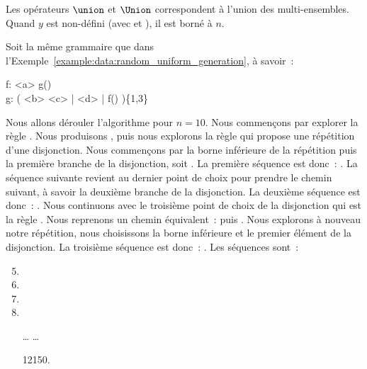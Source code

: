 Les opérateurs $\union$ et $\Union$ correspondent à l'union des multi-ensembles.
Quand $y$ est non-défini (avec \code{*} et \code{+}), il est borné à $n$.

\begin{example}
\label{example:data:bounded_exhaustive_generation}

Soit la même grammaire que dans
l'Exemple~\ref{example:data:random_uniform_generation}, à savoir~:

\begin{pre}
f: <a> g() \\
g: ( <b> <c> | <d> | f() )\{1,3\}
\end{pre}

Nous allons dérouler l'algorithme pour $n = 10$. Nous commençons par explorer
la règle . Nous produisons , puis nous explorons la règle
 qui propose une répétition d'une disjonction.  Nous commençons par la
borne inférieure de la répétition puis la première branche de la disjonction,
soit . La première séquence est donc~: . La
séquence suivante revient au dernier point de choix pour prendre le chemin
suivant, à savoir la deuxième branche de la disjonction. La deuxième séquence
est donc~: . Nous continuons avec le troisième point de choix de
la disjonction qui est la règle . Nous reprenons un chemin équivalent~:
 puis . Nous explorons à nouveau notre répétition, nous
choisissons la borne inférieure et le premier élément de la disjonction. La
troisième séquence est donc~: . Les séquences sont~:

\begin{enumerate}
\setcounter{enumi}{4}

\item {}

\item {}

\item {}

\item {}

\item[…] …

\item[12150.] 

\end{enumerate}

\end{example}

